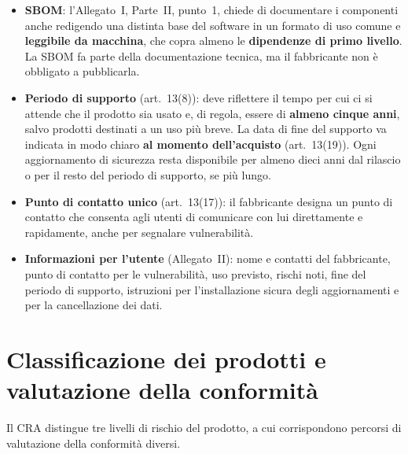 \begin{integrazione}
\begin{itemize}
  \item \textbf{SBOM}: l'Allegato~I, Parte~II, punto~1, chiede di documentare i componenti anche
    redigendo una distinta base del software in un formato di uso comune e \textbf{leggibile da
    macchina}, che copra almeno le \textbf{dipendenze di primo livello}. La SBOM fa parte della
    documentazione tecnica, ma il fabbricante non è obbligato a pubblicarla.
  \item \textbf{Periodo di supporto} (art.~13(8)): deve riflettere il tempo per cui ci si attende che il
    prodotto sia usato e, di regola, essere di \textbf{almeno cinque anni}, salvo prodotti destinati a un
    uso più breve. La data di fine del supporto va indicata in modo chiaro \textbf{al momento
    dell'acquisto} (art.~13(19)). Ogni aggiornamento di sicurezza resta disponibile per almeno dieci anni
    dal rilascio o per il resto del periodo di supporto, se più lungo.
  \item \textbf{Punto di contatto unico} (art.~13(17)): il fabbricante designa un punto di contatto che
    consenta agli utenti di comunicare con lui direttamente e rapidamente, anche per segnalare
    vulnerabilità.
  \item \textbf{Informazioni per l'utente} (Allegato~II): nome e contatti del fabbricante, punto di
    contatto per le vulnerabilità, uso previsto, rischi noti, fine del periodo di supporto, istruzioni
    per l'installazione sicura degli aggiornamenti e per la cancellazione dei dati.
\end{itemize}
\end{integrazione}

\section{Classificazione dei prodotti e valutazione della conformità}
\label{sec:cra-classi}

Il CRA distingue tre livelli di rischio del prodotto, a cui corrispondono percorsi di valutazione della
conformità diversi.

